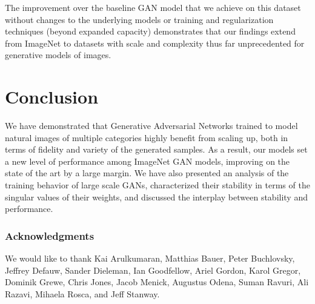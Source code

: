 \documentclass{article} %
\begin{document}
The improvement over the baseline GAN model that we achieve on this dataset
without changes to the underlying models or training and regularization techniques (beyond expanded capacity) demonstrates that
our findings extend from ImageNet
to datasets with scale and complexity thus far unprecedented for generative models of images.



\section{Conclusion}
We have demonstrated that Generative Adversarial Networks trained to model natural images of multiple categories highly benefit from scaling up, both in terms of fidelity and variety of the generated samples. As a result, our models set a new level of performance among ImageNet GAN models, improving on the state of the art by a large margin.
We have also presented an analysis of the training behavior of large scale GANs, characterized their stability in terms of the singular values of their weights, and discussed the interplay between stability and performance.


\subsubsection*{Acknowledgments}
We would like to thank 
Kai Arulkumaran, Matthias Bauer, Peter Buchlovsky, Jeffrey Defauw, Sander Dieleman, Ian Goodfellow, Ariel Gordon, Karol Gregor, Dominik Grewe, Chris Jones, Jacob Menick, Augustus Odena, Suman Ravuri, Ali Razavi, Mihaela Rosca, and Jeff Stanway.



\end{document}

